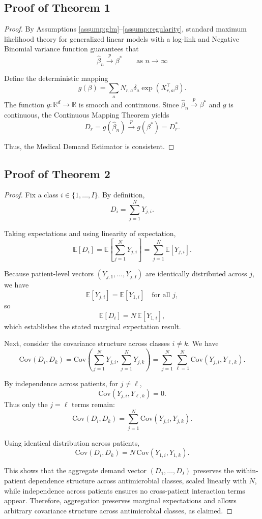 \documentclass{article}
\begin{document}
\subsection{Proof of Theorem 1}
\label{B.2}

\begin{proof}
By Assumptions \ref{assump:glm}--\ref{assump:regularity}, standard maximum likelihood theory for generalized linear models with a log-link and Negative Binomial variance function guarantees that
\[
\hat{\beta}_n \xrightarrow{p} \beta^*
\qquad
\text{as } n \to \infty
\]

Define the deterministic mapping
\[
g(\beta)
=
\sum_a N_{r,a}\delta_a \exp(X_{r,a}^\top \beta).
\]
The function $g:\mathbb{R}^d \to \mathbb{R}$ is smooth and continuous. Since $\hat{\beta}_n \xrightarrow{p} \beta^*$ and $g$ is continuous, the Continuous Mapping Theorem yields
\[
\hat{D}_r
= g(\hat{\beta}_n)
\xrightarrow{p}
g(\beta^*)
= D_r^*.
\]

Thus, the Medical Demand Estimator is consistent.
\end{proof}

\subsection{Proof of Theorem 2}
\label{B.3}

\begin{proof}
Fix a class $i \in \{1,\dots,I\}$. By definition,
\[
D_i = \sum_{j=1}^N Y_{j,i}.
\]

Taking expectations and using linearity of expectation,
\[
\mathbb{E}[D_i]
=
\mathbb{E}\!\left[\sum_{j=1}^N Y_{j,i}\right]
=
\sum_{j=1}^N \mathbb{E}[Y_{j,i}].
\]

Because patient-level vectors $(Y_{j,1},\dots,Y_{j,I})$ are identically distributed across $j$, we have
\[
\mathbb{E}[Y_{j,i}] = \mathbb{E}[Y_{1,i}] \quad \text{for all } j,
\]
so
\[
\mathbb{E}[D_i]
=
N\,\mathbb{E}[Y_{1,i}],
\]
which establishes the stated marginal expectation result.

Next, consider the covariance structure across classes $i \neq k$. We have
\[
\mathrm{Cov}(D_i, D_k)
=
\mathrm{Cov}\!\left(\sum_{j=1}^N Y_{j,i}, \sum_{j=1}^N Y_{j,k}\right)
=
\sum_{j=1}^N \sum_{\ell=1}^N \mathrm{Cov}(Y_{j,i}, Y_{\ell,k}).
\]

By independence across patients, for $j \neq \ell$,
\[
\mathrm{Cov}(Y_{j,i}, Y_{\ell,k}) = 0.
\]
Thus only the $j=\ell$ terms remain:
\[
\mathrm{Cov}(D_i, D_k)
=
\sum_{j=1}^N \mathrm{Cov}(Y_{j,i}, Y_{j,k}).
\]

Using identical distribution across patients,
\[
\mathrm{Cov}(D_i, D_k)
=
N\,\mathrm{Cov}(Y_{1,i}, Y_{1,k}).
\]

This shows that the aggregate demand vector $(D_1,\dots,D_I)$ preserves the within-patient dependence structure across antimicrobial classes, scaled linearly with $N$, while independence across patients ensures no cross-patient interaction terms appear. Therefore, aggregation preserves marginal expectations and allows arbitrary covariance structure across antimicrobial classes, as claimed.
\end{proof}

\printbibliography
\end{document}
